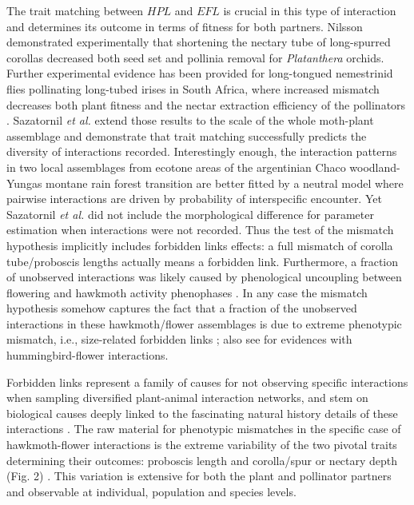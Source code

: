 \documentclass[a4paper,12pt]{article}
\begin{document}
The trait matching between $HPL$ and $EFL$ is crucial in this type of interaction and determines its outcome in terms of fitness for both partners. Nilsson \citep{Nilsson:1988} demonstrated experimentally that shortening the nectary tube of long-spurred corollas decreased both seed set and pollinia removal for \textit{Platanthera} orchids. Further experimental evidence has been provided for long-tongued nemestrinid flies pollinating long-tubed irises in South Africa, where increased mismatch decreases both plant fitness and the nectar extraction efficiency of the pollinators \citep{Pauw:2009} \citep[also see][and references therein]{Anderson:2010}. Sazatornil \textit{et al.} extend those results to the scale of the whole moth-plant assemblage and demonstrate that trait matching successfully predicts the diversity of interactions recorded. Interestingly enough, the interaction patterns in two local assemblages from ecotone areas of the argentinian Chaco woodland-Yungas montane rain forest transition are better fitted by a neutral model where pairwise interactions are driven by probability of interspecific encounter. Yet Sazatornil \textit{et al.} did not include the morphological difference for parameter estimation when interactions were not recorded. Thus the test of the mismatch hypothesis implicitly includes forbidden links effects: a full mismatch of corolla tube/proboscis lengths actually means a forbidden link. Furthermore, a fraction of unobserved interactions was likely caused by phenological uncoupling between flowering and hawkmoth activity phenophases \citep{BasJor:2014,Sazatornil:2016}. In any case the mismatch hypothesis somehow captures the fact that a fraction of the unobserved interactions in these hawkmoth/flower assemblages is due to extreme phenotypic mismatch, i.e., size-related forbidden links \citep{Sazatornil:2016}; also see \citep{VizentinBugoni:2014} for evidences with hummingbird-flower interactions. 

Forbidden links represent a family of causes for not observing specific interactions when sampling diversified plant-animal interaction networks, and stem on biological causes deeply linked to the fascinating natural history details of these interactions \citep{BasJor:2014}. The raw material for phenotypic mismatches in the specific case of hawkmoth-flower interactions is the extreme variability of the two pivotal traits determining their outcomes: proboscis length and corolla/spur or nectary depth (Fig. 2) \citep{Cocucci:2009,Arditti:2012,Nilsson:1988,Miller:1997}. This variation is extensive for both the plant and pollinator partners and observable at individual, population and species levels.
\end{document}
